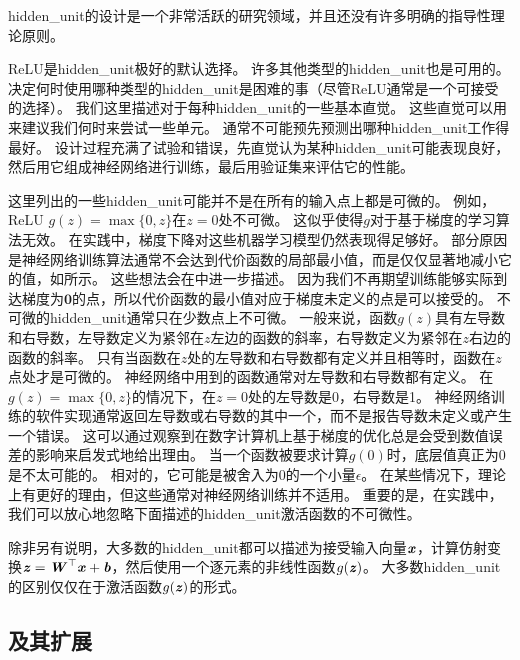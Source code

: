 \gls{hidden_unit}的设计是一个非常活跃的研究领域，并且还没有许多明确的指导性理论原则。

\gls{ReLU}是\gls{hidden_unit}极好的默认选择。
许多其他类型的\gls{hidden_unit}也是可用的。
决定何时使用哪种类型的\gls{hidden_unit}是困难的事（尽管\gls{ReLU}通常是一个可接受的选择）。
我们这里描述对于每种\gls{hidden_unit}的一些基本直觉。
这些直觉可以用来建议我们何时来尝试一些单元。
通常不可能预先预测出哪种\gls{hidden_unit}工作得最好。
设计过程充满了试验和错误，先直觉认为某种\gls{hidden_unit}可能表现良好，然后用它组成神经网络进行训练，最后用验证集来评估它的性能。

这里列出的一些\gls{hidden_unit}可能并不是在所有的输入点上都是可微的。
例如，\gls{ReLU} $g(z)=\max\{0, z\}$在$z=0$处不可微。
这似乎使得$g$对于基于梯度的学习算法无效。
在实践中，梯度下降对这些机器学习模型仍然表现得足够好。
部分原因是神经网络训练算法通常不会达到代价函数的局部最小值，而是仅仅显著地减小它的值，如所示。
这些想法会在中进一步描述。
因为我们不再期望训练能够实际到达梯度为$\bm{0}$的点，所以代价函数的最小值对应于梯度未定义的点是可以接受的。
不可微的\gls{hidden_unit}通常只在少数点上不可微。
一般来说，函数$g(z)$具有左导数和右导数，左导数定义为紧邻在$z$左边的函数的斜率，右导数定义为紧邻在$z$右边的函数的斜率。
只有当函数在$z$处的左导数和右导数都有定义并且相等时，函数在$z$点处才是可微的。
神经网络中用到的函数通常对左导数和右导数都有定义。
在$g(z)=\max\{0,z\}$的情况下，在$z=0$处的左导数是0，右导数是1。
神经网络训练的软件实现通常返回左导数或右导数的其中一个，而不是报告导数未定义或产生一个错误。
这可以通过观察到在数字计算机上基于梯度的优化总是会受到数值误差的影响来启发式地给出理由。
当一个函数被要求计算$g(0)$时，底层值真正为0 是不太可能的。
相对的，它可能是被舍入为0的一个小量$\epsilon$。
在某些情况下，理论上有更好的理由，但这些通常对神经网络训练并不适用。
重要的是，在实践中，我们可以放心地忽略下面描述的\gls{hidden_unit}激活函数的不可微性。


除非另有说明，大多数的\gls{hidden_unit}都可以描述为接受输入向量$\boldsymbol{\mathit{x}}$，计算仿射变换$\boldsymbol{\mathit{z}}=\boldsymbol{\mathit{W}}^\top \boldsymbol{\mathit{x}}+\boldsymbol{\mathit{b}}$，然后使用一个逐元素的非线性函数$g(\boldsymbol{\mathit{z}})$。
大多数\gls{hidden_unit}的区别仅仅在于激活函数$g(\boldsymbol{\mathit{z}})$的形式。

\subsection{及其扩展}
\label{sec:rectified_linear_units_and_their_generalizations}

